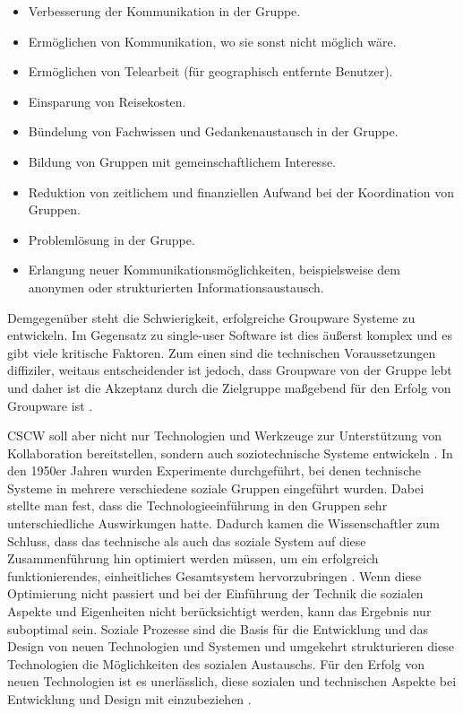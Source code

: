 	\begin{itemize}
		\item {Verbesserung der Kommunikation in der Gruppe.}
		\item {Ermöglichen von Kommunikation, wo sie sonst nicht möglich wäre.}
		\item {Ermöglichen von Telearbeit (für geographisch entfernte Benutzer).}
		\item {Einsparung von Reisekosten.}
		\item {Bündelung von Fachwissen und Gedankenaustausch in der Gruppe.}
		\item {Bildung von Gruppen mit gemeinschaftlichem Interesse.}
		\item {Reduktion von zeitlichem und finanziellen Aufwand bei der Koordination von Gruppen.}
		\item {Problemlösung in der Gruppe.}
		\item {Erlangung neuer Kommunikationsmöglichkeiten, beispielsweise dem anonymen oder strukturierten Informationsaustausch.}
	\end{itemize}
	\begin{flushright}
		\citep{Gerlicher:2007p241}
	\end{flushright}
	
	Demgegenüber steht die Schwierigkeit, erfolgreiche Groupware Systeme zu entwickeln. Im Gegensatz zu single-user Software ist dies äußerst komplex und es gibt viele kritische Faktoren. Zum einen sind die technischen Voraussetzungen diffiziler, weitaus entscheidender ist jedoch, dass Groupware von der Gruppe lebt und daher ist die Akzeptanz durch die Zielgruppe maßgebend für den Erfolg von Groupware ist \citep{Gerlicher:2007p241}.
	
	\medskip \ac{CSCW} soll aber nicht nur Technologien und Werkzeuge zur Unterstützung von Kollaboration bereitstellen, sondern auch soziotechnische Systeme entwickeln \citep{Koch2008}. In den 1950er Jahren wurden Experimente durchgeführt, bei denen technische Systeme in mehrere verschiedene soziale Gruppen eingeführt wurden. Dabei stellte man fest, dass die Technologieeinführung in den Gruppen sehr unterschiedliche Auswirkungen hatte. Dadurch kamen die Wissenschaftler zum Schluss, dass das technische als auch das soziale System auf diese Zusammenführung hin optimiert werden müssen, um ein erfolgreich funktionierendes, einheitliches Gesamtsystem hervorzubringen \citep{Koch2008}. Wenn diese Optimierung nicht passiert und bei der Einführung der Technik die sozialen Aspekte und Eigenheiten nicht berücksichtigt werden, kann das Ergebnis nur suboptimal sein. Soziale Prozesse sind die Basis für die Entwicklung und das Design von neuen Technologien und Systemen und umgekehrt strukturieren diese Technologien die Möglichkeiten des sozialen Austauschs. Für den Erfolg von neuen Technologien ist es unerlässlich, diese sozialen und technischen Aspekte bei Entwicklung und Design mit einzubeziehen \citep{Mumford:2000}.
	
